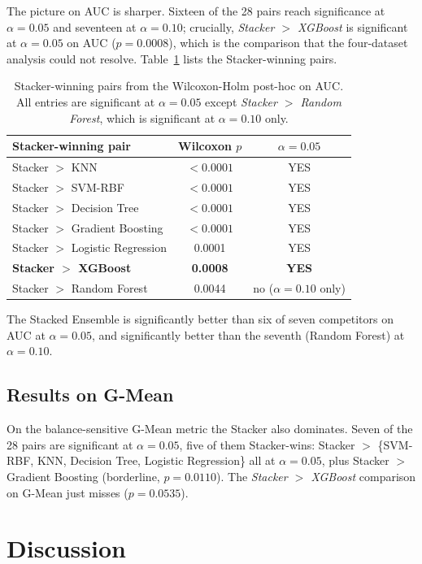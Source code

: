 The picture on AUC is sharper. Sixteen of the 28 pairs reach
significance at $\alpha=0.05$ and seventeen at $\alpha=0.10$;
crucially, \emph{Stacker $>$ XGBoost} is significant at
$\alpha=0.05$ on AUC ($p=0.0008$), which is the comparison that
the four-dataset analysis could not resolve.
Table~\ref{tab:holm-auc} lists the Stacker-winning pairs.

\begin{table}[H]
\centering
\caption{Stacker-winning pairs from the Wilcoxon-Holm post-hoc on
AUC. All entries are significant at $\alpha=0.05$ except
\emph{Stacker $>$ Random Forest}, which is significant at
$\alpha=0.10$ only.}
\singlespacing
\label{tab:holm-auc}
\small
\renewcommand{\arraystretch}{1.15}
\begin{tabular}{l c c}
\toprule
\textbf{Stacker-winning pair} & \textbf{Wilcoxon $p$} & \textbf{$\alpha=0.05$}\\
\midrule
Stacker $>$ KNN & $<\!0.0001$ & YES\\
Stacker $>$ SVM-RBF & $<\!0.0001$ & YES\\
Stacker $>$ Decision Tree & $<\!0.0001$ & YES\\
Stacker $>$ Gradient Boosting & $<\!0.0001$ & YES\\
Stacker $>$ Logistic Regression & 0.0001 & YES\\
\textbf{Stacker $>$ XGBoost} & \textbf{0.0008} & \textbf{YES}\\
Stacker $>$ Random Forest & 0.0044 & no ($\alpha=0.10$ only)\\
\bottomrule
\end{tabular}
\end{table}
The Stacked Ensemble is significantly better than six of seven
competitors on AUC at $\alpha=0.05$, and significantly better than
the seventh (Random Forest) at $\alpha=0.10$.

\subsection{Results on G-Mean}

On the balance-sensitive G-Mean metric the Stacker also dominates.
Seven of the 28 pairs are significant at $\alpha=0.05$, five of
them Stacker-wins: Stacker $>$ \{SVM-RBF, KNN, Decision Tree,
Logistic Regression\} all at $\alpha=0.05$, plus Stacker $>$
Gradient Boosting (borderline, $p=0.0110$). The
\emph{Stacker $>$ XGBoost} comparison on G-Mean just misses
($p=0.0535$).

\section{Discussion}
\label{sec:discussion}


